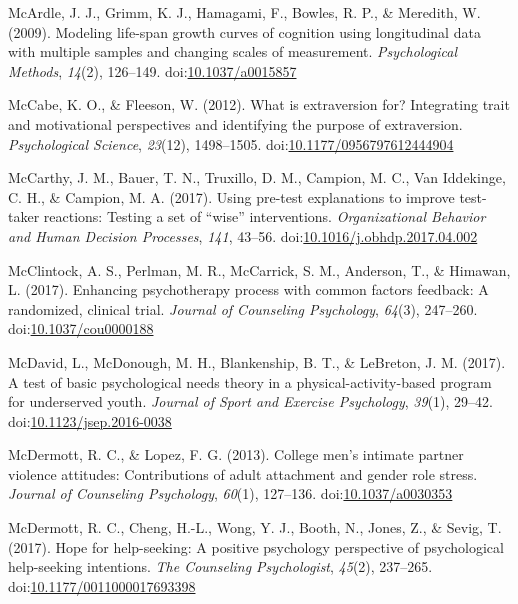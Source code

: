 \documentclass[english,man]{apa6}
\begin{document}
\hypertarget{ref-McArdle2009}{}
McArdle, J. J., Grimm, K. J., Hamagami, F., Bowles, R. P., \& Meredith,
W. (2009). Modeling life-span growth curves of cognition using
longitudinal data with multiple samples and changing scales of
measurement. \emph{Psychological Methods}, \emph{14}(2), 126--149.
doi:\href{https://doi.org/10.1037/a0015857}{10.1037/a0015857}

\hypertarget{ref-McCabe2012}{}
McCabe, K. O., \& Fleeson, W. (2012). What is extraversion for?
Integrating trait and motivational perspectives and identifying the
purpose of extraversion. \emph{Psychological Science}, \emph{23}(12),
1498--1505.
doi:\href{https://doi.org/10.1177/0956797612444904}{10.1177/0956797612444904}

\hypertarget{ref-McCarthy2017}{}
McCarthy, J. M., Bauer, T. N., Truxillo, D. M., Campion, M. C., Van
Iddekinge, C. H., \& Campion, M. A. (2017). Using pre-test explanations
to improve test-taker reactions: Testing a set of ``wise''
interventions. \emph{Organizational Behavior and Human Decision
Processes}, \emph{141}, 43--56.
doi:\href{https://doi.org/10.1016/j.obhdp.2017.04.002}{10.1016/j.obhdp.2017.04.002}

\hypertarget{ref-McClintock2017}{}
McClintock, A. S., Perlman, M. R., McCarrick, S. M., Anderson, T., \&
Himawan, L. (2017). Enhancing psychotherapy process with common factors
feedback: A randomized, clinical trial. \emph{Journal of Counseling
Psychology}, \emph{64}(3), 247--260.
doi:\href{https://doi.org/10.1037/cou0000188}{10.1037/cou0000188}

\hypertarget{ref-McDavid2017}{}
McDavid, L., McDonough, M. H., Blankenship, B. T., \& LeBreton, J. M.
(2017). A test of basic psychological needs theory in a
physical-activity-based program for underserved youth. \emph{Journal of
Sport and Exercise Psychology}, \emph{39}(1), 29--42.
doi:\href{https://doi.org/10.1123/jsep.2016-0038}{10.1123/jsep.2016-0038}

\hypertarget{ref-McDermott2013}{}
McDermott, R. C., \& Lopez, F. G. (2013). College men's intimate partner
violence attitudes: Contributions of adult attachment and gender role
stress. \emph{Journal of Counseling Psychology}, \emph{60}(1), 127--136.
doi:\href{https://doi.org/10.1037/a0030353}{10.1037/a0030353}

\hypertarget{ref-McDermott2017}{}
McDermott, R. C., Cheng, H.-L., Wong, Y. J., Booth, N., Jones, Z., \&
Sevig, T. (2017). Hope for help-seeking: A positive psychology
perspective of psychological help-seeking intentions. \emph{The
Counseling Psychologist}, \emph{45}(2), 237--265.
doi:\href{https://doi.org/10.1177/0011000017693398}{10.1177/0011000017693398}
\end{document}
